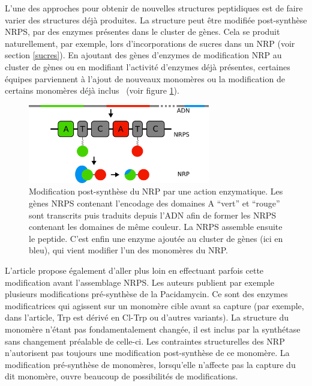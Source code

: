 L'une des approches pour obtenir de nouvelles structures peptidiques est de faire varier des structures déjà produites.
La structure peut être modifiée post-synthèse NRPS, par des enzymes présentes dans le cluster de gènes.
Cela se produit naturellement, par exemple, lors d'incorporations de sucres dans un NRP (voir section \ref{sucres}).
En ajoutant des gènes d'enzymes de modification NRP au cluster de gènes ou en modifiant l'activité d'enzymes déjà présentes, certaines équipes parviennent à l'ajout de nouveaux monomères ou la modification de certains monomères déjà inclus~\cite{giessen_ribosome-independent_2012} (voir figure \ref{post_synth}).

\begin{figure}[h!]
  \begin{center}
    \includegraphics[width=300px]{Figures/synthese/post_synth.png}
    \caption{\label{post_synth}Modification post-synthèse du NRP par une action enzymatique.
    Les gènes NRPS contenant l'encodage des domaines A ``vert'' et ``rouge'' sont transcrits puis traduits depuis l'ADN afin de former les NRPS contenant les domaines de même couleur.
    La NRPS assemble ensuite le peptide.
    C'est enfin une enzyme ajoutée au cluster de gènes (ici en bleu), qui vient modifier l'un des monomères du NRP.}
  \end{center}
\end{figure}

L'article \cite{winn_recent_2016} propose également d'aller plus loin en effectuant parfois cette modification avant l'assemblage NRPS.
Les auteurs publient par exemple plusieurs modifications pré-synthèse de la Pacidamycin.
Ce sont des enzymes modificatrices qui agissent sur un monomère cible avant sa capture (par exemple, dans l'article, Trp est dérivé en Cl-Trp ou d'autres variants).
La structure du monomère n'étant pas fondamentalement changée, il est inclus par la synthétase sans changement préalable de celle-ci.
Les contraintes structurelles des NRP n'autorisent pas toujours une modification post-synthèse de ce monomère.
La modification pré-synthèse de monomères, lorsqu'elle n'affecte pas la capture du dit monomère, ouvre beaucoup de possibilités de modifications.


